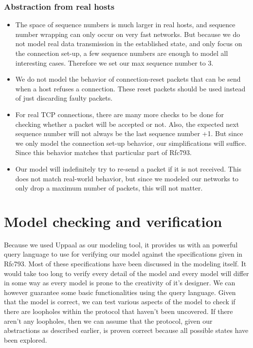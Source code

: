 \documentclass[twocolumn]{article}
\begin{document}
\subsubsection{Abstraction from real hosts}
\begin{itemize}
\item The space of sequence numbers is much larger in real hosts, and sequence number wrapping can only occur on very fast networks. But because we do not model real data transmission in the established state, and only focus on the connection set-up, a few sequence numbers are enough to model all interesting cases. Therefore we set our max sequence number to 3.
\item We do not model the behavior of connection-reset packets that can be send when a host refuses a connection. These reset packets should be used instead of just discarding faulty packets.
\item For real TCP connections, there are many more checks to be done for checking whether a packet will be accepted or not. Also, the expected next sequence number will not always be the last sequence number +1. But since we only model the connection set-up behavior, our simplifications will suffice. Since this behavior matches that particular part of Rfc793.
\item Our model will indefinitely try to re-send a packet if it is not received. This does not match real-world behavior, but since we modeled our networks to only drop a maximum number of packets, this will not matter.
\end{itemize}






\section{Model checking and verification} %
\label{sec:model_checking_and_verification}
	Because we used Uppaal as our modeling tool, it provides us with an powerful query language to use for verifying our model against the specifications given in Rfc793. Most of these specifications have been discussed in the modeling itself. It would take too long to verify every detail of the model and every model will differ in some way as every model is prone to the creativity of it's designer. We can however guarantee some basic functionalities using the query language. Given that the model is correct, we can test various aspects of the model to check if there are loopholes within the protocol that haven't been uncovered. If there aren't any loopholes, then we can assume that the protocol, given our abstractions as described earlier, is proven correct because all possible states have been explored.
\end{document}
